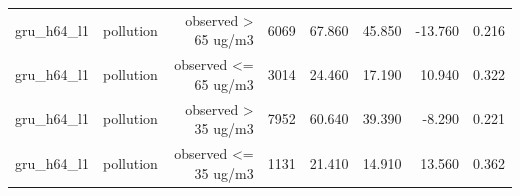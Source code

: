 \begin{table}[htbp]
\begin{tabular}{lrrrrrrr}
gru\_h64\_l1 & pollution & observed > 65 ug/m3 & 6069 & 67.860 & 45.850 & -13.760 & 0.216 \\
gru\_h64\_l1 & pollution & observed <= 65 ug/m3 & 3014 & 24.460 & 17.190 & 10.940 & 0.322 \\
gru\_h64\_l1 & pollution & observed > 35 ug/m3 & 7952 & 60.640 & 39.390 & -8.290 & 0.221 \\
gru\_h64\_l1 & pollution & observed <= 35 ug/m3 & 1131 & 21.410 & 14.910 & 13.560 & 0.362 \\
\bottomrule
\end{tabular}
\end{table}
